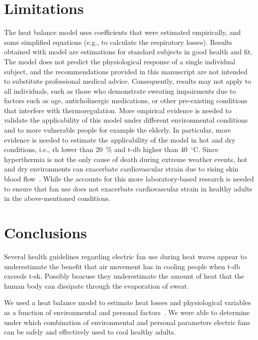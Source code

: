 \section*{Limitations}
The  heat balance model uses coefficients that were estimated empirically, and some simplified equations (e.g., to calculate the respiratory losses).
Results obtained with  model are estimations for standard subjects in good health and fit.
The model does not predict the physiological response of a single individual subject, and the recommendations provided in this manuscript are not intended to substitute professional medical advice.
Consequently, results may not apply to all individuals, such as those who demonstrate sweating impairments due to factors such as age, anticholinergic medications, or other pre-existing conditions that interfere with thermoregulation.
More empirical evidence is needed to validate the applicability of this model under different environmental conditions and to more vulnerable people for example the elderly.
In particular, more evidence is needed to estimate the applicability of the  model in hot and dry conditions, i.e., \ac{rh} lower than 20~\% and \ac{t-db} higher than 40~$^{\circ}$C.
Since hyperthermia is not the only cause of death during extreme weather events, hot and dry environments can exacerbate cardiovascular strain due to rising skin blood flow~\cite{Morris2021a}.
While the  accounts for this more laboratory-based research is needed to ensure that fan use does not exacerbate cardiovascular strain in healthy adults in the above-mentioned conditions.

\section{Conclusions}\label{sec:conclusions}
Several health guidelines regarding electric fan use during heat waves appear to underestimate the benefit that air movement has in cooling people when \acf{t-db} exceeds \acf{t-sk}.
Possibly beacuse they underestimate the amount of heat that the human body can dissipate through the evaporation of sweat.

We used a heat balance model to estimate heat losses and physiological variables as a function of environmental and personal factors~\cite{Gagge1986}.
We were able to determine under which combination of environmental and personal parameters electric fans can be safely and effectively used to cool healthy adults.

